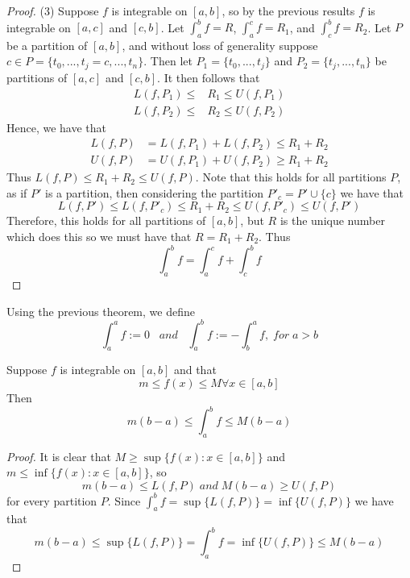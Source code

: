 \begin{proof}
    (3) Suppose $f$ is integrable on $[a,b]$, so by the previous results $f$ is integrable on $[a,c]$ and $[c,b]$. Let $\int_a^bf = R$, $\int_a^cf = R_1$, and $\int_c^bf = R_2$. Let $P$ be a partition of $[a,b]$, and without loss of generality suppose $c \in P = \{t_0,...,t_j = c,...,t_n\}$. Then let $P_1 = \{t_0,...,t_j\}$ and $P_2 = \{t_j,...,t_n\}$ be partitions of $[a,c]$ and $[c,b]$. It then follows that \begin{align*}
        L(f,P_1) \leq &R_1 \leq U(f,P_1) \\
        L(f,P_2) \leq &R_2 \leq U(f,P_2)
    \end{align*}
    Hence, we have that \begin{align*}
        L(f,P) &= L(f,P_1) + L(f,P_2) \leq R_1 + R_2 \\
        U(f,P) &= U(f,P_1) + U(f,P_2) \geq R_1 + R_2
    \end{align*}
    Thus $L(f,P) \leq R_1 + R_2\leq U(f,P)$. Note that this holds for all partitions $P$, as if $P'$ is a partition, then considering the partition $P'_{c} = P' \cup \{c\}$ we have that $$L(f,P') \leq L(f,P'_{c}) \leq R_1 + R_2 \leq U(f,P'_{c}) \leq U(f,P')$$
    Therefore, this holds for all partitions of $[a,b]$, but $R$ is the unique number which does this so we must have that $R = R_1 + R_2$. Thus \begin{equation*}
        \int_a^bf = \int_a^cf + \int_c^bf
    \end{equation*}
\end{proof}


\begin{definition}
    Using the previous theorem, we define \begin{equation}
        \int_a^af := 0 \;\;\;and\;\;\;\int_a^bf := -\int_b^af,\;for\;a>b
    \end{equation}
\end{definition}


\begin{theorem}\label{thm:boundint}
    Suppose $f$ is integrable on $[a,b]$ and that \begin{equation}
        m \leq f(x) \leq M \forall x \in [a,b]
    \end{equation}
    Then \begin{equation}
        m(b-a) \leq \int_a^bf \leq M(b-a)
    \end{equation}
\end{theorem}
\begin{proof}
    It is clear that $M \geq \sup\{f(x):x \in [a,b]\}$ and $m \leq \inf\{f(x):x\in [a,b]\}$, so \begin{equation*}
        m(b-a) \leq L(f,P)\;and\;M(b-a) \geq U(f,P)
    \end{equation*}
    for every partition $P$. Since $\int_a^bf = \sup\{L(f,P)\} = \inf\{U(f,P)\}$ we have that \begin{equation*}
        m(b-a) \leq \sup\{L(f,P)\} = \int_a^bf = \inf\{U(f,P)\} \leq M(b-a)
    \end{equation*}
\end{proof}

